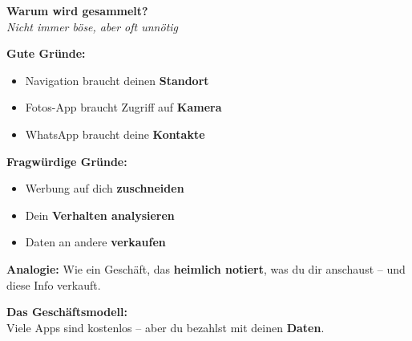 \documentclass[a4paper,landscape,8pt]{extarticle}
\begin{document}
\hfill%
\begin{minipage}[t]{0.32\linewidth}
\begin{center}
\colorbox{datagreen!10}{%
\begin{minipage}{0.95\linewidth}
\vspace{2mm}
\begin{center}
{\Large\bfseries\textcolor{datagreen}{Warum wird gesammelt?}}\\[1pt]
{\footnotesize\itshape Nicht immer böse, aber oft unnötig}
\end{center}
\vspace{2mm}
\end{minipage}%
}
\end{center}

\vspace{1mm}

\textbf{Gute Gründe:}
\begin{itemize}
\item Navigation braucht deinen \textbf{Standort}
\item Fotos-App braucht Zugriff auf \textbf{Kamera}
\item WhatsApp braucht deine \textbf{Kontakte}
\end{itemize}

\textbf{Fragwürdige Gründe:}
\begin{itemize}
\item Werbung auf dich \textbf{zuschneiden}
\item Dein \textbf{Verhalten analysieren}
\item Daten an andere \textbf{verkaufen}
\end{itemize}

\textbf{Analogie:} Wie ein Geschäft, das \textbf{heimlich notiert}, was du dir anschaust -- und diese Info verkauft.

\vspace{2mm}

\textbf{Das Geschäftsmodell:}\\
Viele Apps sind \glqq kostenlos\grqq{} -- aber du bezahlst mit deinen \textbf{Daten}.

\begin{center}
\end{center}

\end{minipage}%
\end{document}

